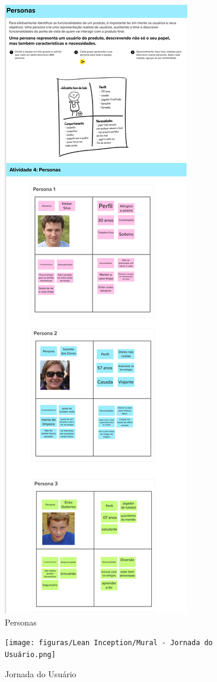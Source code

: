 \begin{anexosenv}
 \begin{figure}[H]
\centering
\includegraphics[height=\textheight]{figuras/Lean Inception/Mural - Personas.png}
\caption{Personas}
\label{Personas}
\end{figure}

\begin{figure}[H]
\centering
\texttt{[image: figuras/Lean Inception/Mural - Jornada do Usuário.png]}
\caption{Jornada do Usuário}
\label{Jornada do Usuário}
\end{figure}


\end{anexosenv}

